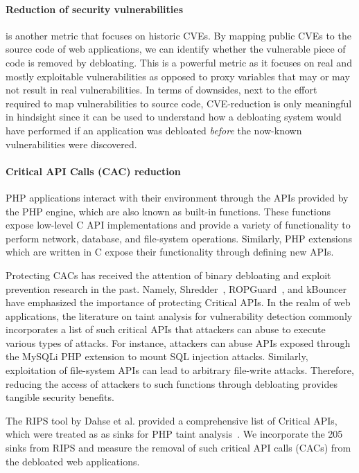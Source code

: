 \paragraph{Reduction of security vulnerabilities} is another metric that focuses on historic CVEs. 
By mapping public CVEs to the source code of web applications, we can identify whether the vulnerable piece of code is removed by debloating. 
This is a powerful metric as it focuses on real and mostly exploitable vulnerabilities as opposed to proxy variables that may or may not result in real vulnerabilities. In terms of downsides, next to the effort required to map vulnerabilities to source code, CVE-reduction is only meaningful in hindsight since it can be used to understand how a debloating system would have performed if an application was debloated \emph{before} the now-known vulnerabilities were discovered. 


\paragraph{Critical API Calls (CAC) reduction} 
PHP applications interact with their environment through the APIs provided by the PHP engine, which are also known as built-in functions. 
These functions expose low-level C API implementations and provide a variety of functionality to perform network, database, and file-system operations. 
Similarly, PHP extensions which are written in C expose their functionality through defining new APIs. 

Protecting CACs has received the attention of binary debloating and exploit prevention research in the past. 
Namely, Shredder~\cite{mishra2018shredder}, ROPGuard~\cite{fratric2012ropguard}, and kBouncer~\cite{pappas2012kbouncer} have emphasized the importance of protecting Critical APIs. 
In the realm of web applications, the literature on taint analysis for vulnerability detection commonly incorporates a list of such critical APIs that attackers can abuse to execute various types of attacks. 
For instance, attackers can abuse APIs exposed through the MySQLi PHP extension to mount SQL injection attacks. 
Similarly, exploitation of file-system APIs can lead to arbitrary file-write attacks. 
Therefore, reducing the access of attackers to such functions through debloating provides tangible security benefits.

The RIPS tool by Dahse et al. provided a comprehensive list of Critical APIs, which were treated as as sinks for PHP taint analysis~\cite{dahse2010rips}. 
We incorporate the 205 sinks from RIPS and measure the removal of such critical API calls (CACs) from the debloated web applications. 

